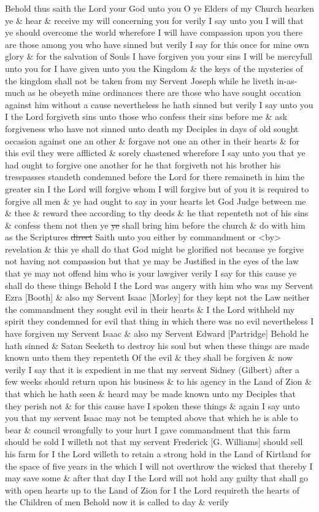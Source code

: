 {				Behold thus saith the Lord your God unto you O ye Elders of my Church hearken ye \& hear \& receive my will concerning you for verily I say unto you I will that ye should overcome the world wherefore I will have compassion upon you there are those among you who have sinned but verily I say for this once for mine own glory \& for the salvation of Souls I have forgiven you your sins I will be mercyfull unto you for I have given unto you the Kingdom \& the keys of the mysteries of the kingdom shall not be taken from my Servent Joseph while he liveth in-as-much as he obeyeth mine ordinances there are those who have sought occation against him without a cause nevertheless he hath sinned but verily I say unto you I the Lord forgiveth sins unto those who confess their sins before me \& ask forgiveness who have not sinned unto death my Deciples in days of old sought occasion against one an other \& forgave not one an other in their hearts \& for this evil they were afflicted \& sorely chastened wherefore I say unto you that ye had ought to forgive one another for he that forgiveth not his brother his tresspasses standeth condemned before the Lord for there remaineth in him the greater sin I the Lord will forgive whom I will forgive but of you it is required to forgive all men \& ye had ought to say in your hearts let God Judge between me \& thee \& reward thee according to thy deeds \& he that repenteth not of his sins \& confess them not then ye \sout{ye} shall bring him before the church \& do with him as the Scriptures \sout{direct} Saith unto you either by commandment or <by> revelation \& this ye shall do that God might be glorified not because ye forgive not having not compassion but that ye may be Justified in the eyes of the law that ye may not offend him who is your lawgiver verily I say for this cause ye shall do these things Behold I the Lord was angery with him who was my Servent Ezra [Booth] \& also my Servent Isaac [Morley] for they kept not the Law neither the commandment they sought evil in their hearts \& I the Lord withheld my spirit they condemned for evil that thing in which there was no evil nevertheless I have forgiven my Servent Isaac \& also my Servent Edward [Partridge] Behold he hath sinned \& Satan Seeketh to destroy his soul but when these things are made known unto them they repenteth Of the evil \& they shall be forgiven \& now verily I say that it is expedient in me that my servent Sidney (Gilbert) after a few weeks should return upon his business \& to his agency in the Land of Zion \& that which he hath seen \& heard may be made known unto my Deciples that they perish not \& for this cause have I spoken these things \& again I say unto you that my servent Isaac may not be tempted above that which he is able to bear \& council wrongfully to your hurt I gave commandment that this farm should be sold I willeth not that my servent Frederick [G. Williams] should sell his farm for I the Lord willeth to retain a strong hold in the Land of Kirtland for the space of five years in the which I will not overthrow the wicked that thereby I may save some \& after that day I the Lord will not hold any guilty that shall go with open hearts up to the Land of Zion for I the Lord requireth the hearts of the Children of men Behold now it is called to day \& verily }
